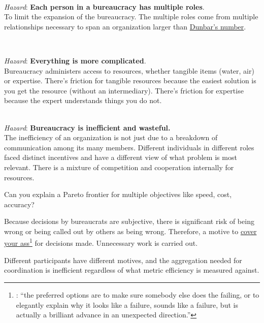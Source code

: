 \ \\
\textit{Hazard}: \textbf{Each person in a bureaucracy has multiple roles}.\\
To limit the expansion of the bureaucracy. The multiple roles come from multiple relationships necessary to span an organization larger than \href{https://en.wikipedia.org/wiki/Dunbar\%27s_number}{Dunbar's number}. 

\ \\
\begin{samepage}
\textit{Hazard}: \textbf{Everything is more complicated}. \\
Bureaucracy administers access to resources, whether tangible items (water, air) or expertise. There's friction for tangible resources because the easiest solution is you get the resource (without an intermediary). There's friction for expertise because the expert understands things you do not. 
\end{samepage}

\ \\
\textit{Hazard}: \textbf{Bureaucracy is inefficient and wasteful.}\\
The inefficiency of an organization is not just due to a breakdown of communication among its many members. Different individuals in different roles faced distinct incentives and have a different view of what problem is most relevant. There is a mixture of competition and cooperation internally for resources.

Can you explain a Pareto frontier for multiple objectives like speed, cost, accuracy?

Because decisions by bureaucrats are subjective, there is significant risk of being wrong or being called out by others as being wrong. Therefore, a motive to 
\href{https://en.wikipedia.org/wiki/Cover_your_ass}{
cover your ass}\footnote{
\cite{1996_unknown}: ``the preferred options are to make sure somebody else does the failing, or to elegantly explain why it looks like a failure, sounds like a failure, but is actually a brilliant advance in an unexpected direction.''}
for decisions made. Unnecessary work is carried out. 

Different participants have different motives, and the aggregation needed for coordination is inefficient regardless of what metric efficiency is measured against.

